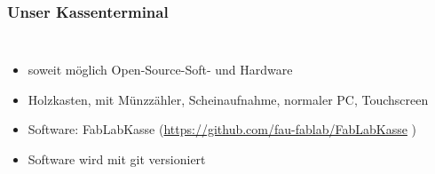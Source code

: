 \documentclass[german]{beamer} %
\newcommand{\images}{kassenterminal/}
\begin{document}
\begin{frame}
\frametitle{Unser Kassenterminal}
\begin{columns}[c]
 \begin{itemize}
 \item soweit möglich Open-Source-Soft- und Hardware
 \item Holzkasten, mit Münzzähler, Scheinaufnahme, normaler PC, Touchscreen
 \item Software: FabLabKasse (\url{https://github.com/fau-fablab/FabLabKasse} )
 \item Software wird mit git versioniert
 \end{itemize}
 \end{columns}
\end{frame}
\end{document}
